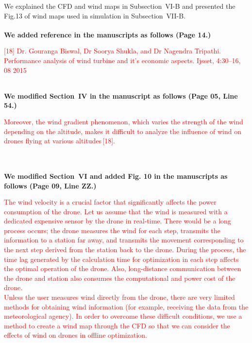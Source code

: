 \documentclass[onecolumn]{IEEEconf}
\begin{document}
\begin{description}
{    We explained the CFD and wind maps in Subsection~VI-B and presented the Fig.13 of wind maps used in simulation in Subsection~VII-B.
	}
	~\\
    ~\\
	\textbf{We added reference in the manuscripts as follows (Page 14.)}\\
    \begin{mdframed}[ linewidth=.75pt, userdefinedwidth=0.9\textwidth]
    \textcolor{red}{[18] Dr. Gouranga Biswal,  Dr Soorya Shukla, and Dr Nagendra Tripathi. Performance analysis of wind turbine and it’s economic aspects. Ijsset, 4:30–16, 08 2015}
    \end{mdframed} 
    ~\\
    \textbf{We modified Section~IV in the manuscript as follows (Page 05, Line 54.)}\\
    \begin{mdframed}[ linewidth=.75pt, userdefinedwidth=0.9\textwidth]
    \textcolor{red}{Moreover, the wind gradient phenomenon, which varies the strength of the wind depending on the altitude, makes it difficult to analyze the influence of wind on drones flying at various altitudes\,[18].}
    \end{mdframed}
	~\\
	~\pagebreak~\\
	\textbf{We modified Section~VI and added Fig. 10 in the manuscripts as follows (Page 09, Line ZZ.)}\\
    \begin{mdframed}[ linewidth=.75pt, userdefinedwidth=0.9\textwidth]
    \justify
    \textcolor{red}{The wind velocity is a crucial factor that significantly affects the power consumption of the drone. Let us assume that the wind is measured with a dedicated expensive sensor by the drone in real-time. There would be a long process occurs; 
    the drone measures the wind for each step, transmits the information to a station far away, and transmits the movement corresponding to the next step derived from the station back to the drone.
    During the process, the time lag generated by the calculation time for optimization in each step affects the optimal operation of the drone. 
    Also, long-distance communication between the drone and station also consumes the computational and power cost of the drone.~\\
    Unless the user measures wind directly from the drone, there are very limited methods for obtaining wind information (for example, receiving the data from the meteorological agency).
    In order to overcome these difficult conditions, we use a method to create a wind map through the CFD so that we can consider the effects of wind on drones in offline optimization.
}
\end{mdframed}
\end{description}
\end{document}
